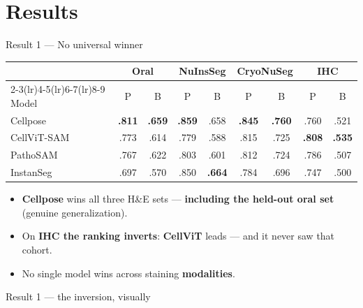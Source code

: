 \section{Results}

\begin{frame}{Result 1 --- No universal winner}
    \scriptsize
    \centering
    \renewcommand{\arraystretch}{1.15}
    \setlength{\tabcolsep}{4pt}
    \begin{tabular}{@{}l cc cc cc cc@{}}
        \toprule
        & \multicolumn{2}{c}{\textbf{Oral}} & \multicolumn{2}{c}{\textbf{NuInsSeg}}
        & \multicolumn{2}{c}{\textbf{CryoNuSeg}} & \multicolumn{2}{c}{\textbf{IHC}} \\
        \cmidrule(lr){2-3}\cmidrule(lr){4-5}\cmidrule(lr){6-7}\cmidrule(lr){8-9}
        Model & P & B & P & B & P & B & P & B \\
        \midrule
        Cellpose    & {\color{mygreen}\textbf{.811}} & {\color{mygreen}\textbf{.659}} & {\color{mygreen}\textbf{.859}} & .658 & {\color{mygreen}\textbf{.845}} & {\color{mygreen}\textbf{.760}} & .760 & .521 \\
        CellViT-SAM & .773 & .614 & .779 & .588 & .815 & .725 & {\color{mygreen}\textbf{.808}} & {\color{mygreen}\textbf{.535}} \\
        PathoSAM    & .767 & .622 & .803 & .601 & .812 & .724 & .786 & .507 \\
        InstanSeg   & .697 & .570 & .850 & {\color{mygreen}\textbf{.664}} & .784 & .696 & .747 & .500 \\
        \bottomrule
    \end{tabular}

    \vspace{0.7em}
    \footnotesize
    \begin{itemize}
        \item \textbf{Cellpose} wins all three H\&E sets --- \textbf{\color{myred}including the held-out oral set} (genuine generalization).
        \item On \textbf{IHC the ranking inverts}: {\color{mygreen}\textbf{CellViT}} leads --- and it never saw that cohort.
        \item[$\Rightarrow$] No single model wins across staining \textbf{modalities}.
    \end{itemize}
\end{frame}

\begin{frame}{Result 1 --- the inversion, visually}
\end{frame}

